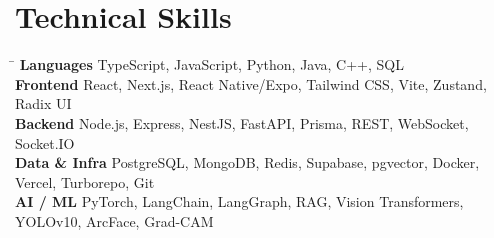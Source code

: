 \documentclass[a4paper,10pt]{article}
\begin{document}
\section{Technical Skills}
\begin{tabbing}
\hspace{5.2em}\=\kill
\textbf{Languages}\> TypeScript, JavaScript, Python, Java, C++, SQL\\
\textbf{Frontend}\>  React, Next.js, React Native/Expo, Tailwind CSS, Vite, Zustand, Radix UI\\
\textbf{Backend}\>   Node.js, Express, NestJS, FastAPI, Prisma, REST, WebSocket, Socket.IO\\
\textbf{Data \& Infra}\> PostgreSQL, MongoDB, Redis, Supabase, pgvector, Docker, Vercel, Turborepo, Git\\
\textbf{AI / ML}\>   PyTorch, LangChain, LangGraph, RAG, Vision Transformers, YOLOv10, ArcFace, Grad-CAM
\end{tabbing}
\end{document}
